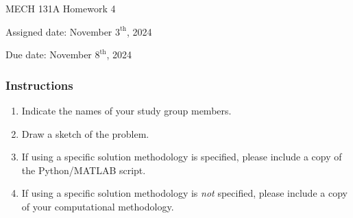 \documentclass[12pt,letterpaper]{article}
\begin{document}
\noindent
MECH 131A Homework 4

\noindent
Assigned date: November $3^{\mathrm{th}}$, 2024

\noindent
Due date: November $8^{\mathrm{th}}$, 2024

\subsubsection*{Instructions}
\begin{enumerate}
	\item Indicate the names of your study group members.
	\item Draw a sketch of the problem.
	\item If using a specific solution methodology is specified, please include a copy of the Python/MATLAB script.
	\item If using a specific solution methodology is \textit{not} specified, please include a copy of your computational methodology.
\end{enumerate}
\end{document}
